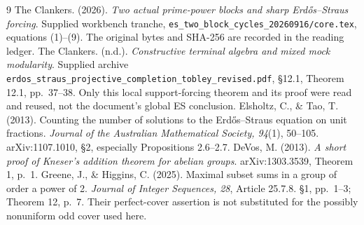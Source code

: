 \begin{thebibliography}{9}
 The Clankers. (2026). \emph{Two actual prime-power blocks and
sharp Erd\H{o}s--Straus forcing}. Supplied workbench tranche,
\texttt{es\_two\_block\_cycles\_20260916/core.tex}, equations (1)--(9).
The original bytes and SHA-256 are recorded in the reading ledger.
 The Clankers. (n.d.). \emph{Constructive terminal algebra and
mixed mock modularity}. Supplied archive
\texttt{erdos\_straus\_projective\_completion\_tobley\_revised.pdf},
\S12.1, Theorem 12.1, pp.~37--38. Only this local support-forcing theorem and
its proof were read and reused, not the document's global ES conclusion.
 Elsholtz, C., \& Tao, T. (2013). Counting the number of solutions
to the Erd\H{o}s--Straus equation on unit fractions.
\emph{Journal of the Australian Mathematical Society, 94}(1), 50--105.
arXiv:1107.1010, \S2, especially Propositions 2.6--2.7.
 DeVos, M. (2013). \emph{A short proof of Kneser's addition
theorem for abelian groups}. arXiv:1303.3539, Theorem 1, p.~1.
 Greene, J., \& Higgins, C. (2025). Maximal subset sums in a group
of order a power of 2. \emph{Journal of Integer Sequences, 28}, Article 25.7.8.
\S1, pp.~1--3; Theorem 12, p.~7. Their perfect-cover assertion is not substituted
for the possibly nonuniform odd cover used here.
\end{thebibliography}
